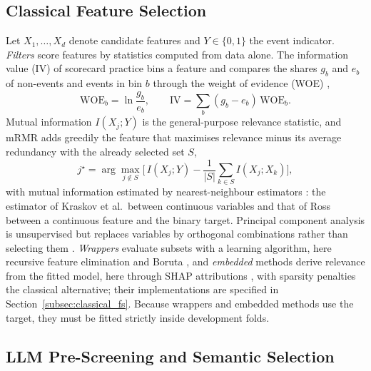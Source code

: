 \documentclass[final,5p,twocolumn]{elsarticle}
\begin{document}
\subsection{Classical Feature Selection}
\label{subsec:classical_fs_background}

Let $X_1,\dots,X_d$ denote candidate features and $Y\in\{0,1\}$ the event indicator. \emph{Filters} score features by statistics computed from data alone. The information value (IV) of scorecard practice bins a feature and compares the shares $g_b$ and $e_b$ of non-events and events in bin $b$ through the weight of evidence (WOE) \cite{siddiqi2006},
\begin{equation}
    \mathrm{WOE}_b=\ln\frac{g_b}{e_b},\qquad
    \mathrm{IV}=\sum_{b}(g_b-e_b)\,\mathrm{WOE}_b .
    \label{eq:iv}
\end{equation}
Mutual information $I(X_j;Y)$ is the general-purpose relevance statistic, and mRMR \cite{peng2005} adds greedily the feature that maximises relevance minus its average redundancy with the already selected set $S$,
\begin{equation}
    j^{\star}=\arg\max_{j\notin S}\Big[\,I(X_j;Y)-\frac{1}{|S|}\sum_{k\in S} I(X_j;X_k)\Big],
    \label{eq:mrmr}
\end{equation}
with mutual information estimated by nearest-neighbour estimators \cite{kraskov2004,ross2014}: the estimator of Kraskov et al.\ between continuous variables and that of Ross between a continuous feature and the binary target. Principal component analysis is unsupervised but replaces variables by orthogonal combinations rather than selecting them \cite{jolliffe2016}. \emph{Wrappers} evaluate subsets with a learning algorithm, here recursive feature elimination \cite{guyon2002} and Boruta \cite{kursa2010,breiman2001}, and \emph{embedded} methods derive relevance from the fitted model, here through SHAP attributions \cite{lundberg2017}, with sparsity penalties \cite{tibshirani1996} the classical alternative; their implementations are specified in Section~\ref{subsec:classical_fs}. Because wrappers and embedded methods use the target, they must be fitted strictly inside development folds.

\subsection{LLM Pre-Screening and Semantic Selection}
\label{subsec:llm_fs_background}
\end{document}
